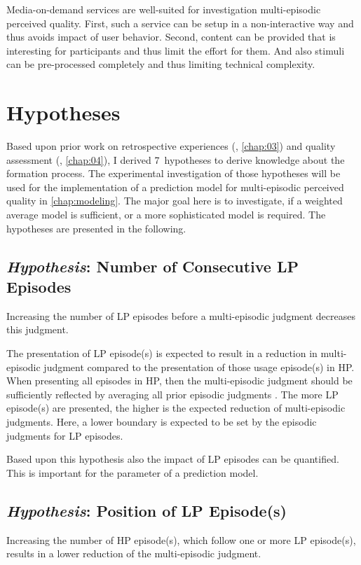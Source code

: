 Media-on-demand services are well-suited for investigation multi-episodic perceived quality.
First, such a service can be setup in a non-interactive way and thus avoids impact of user behavior.
Second, content can be provided that is interesting for participants and thus limit the effort for them.
And also stimuli can be pre-processed completely and thus limiting technical complexity.

\section{Hypotheses}
Based upon prior work on retrospective experiences (\cf, \autoref{chap:03}) and quality assessment (\cf, \autoref{chap:04}), I derived 7~hypotheses to derive knowledge about the formation process.
The experimental investigation of those hypotheses will be used for the implementation of a prediction model for multi-episodic perceived quality in \autoref{chap:modeling}.
The major goal here is to investigate, if a weighted average model is sufficient, or a more sophisticated model is required.
The hypotheses are presented in the following.

\subsection{\emph{Hypothesis}: Number of Consecutive \acs{LP} Episodes}
\begin{hypothesis}\label{hypo:number}
Increasing the number of \ac{LP} episodes before a multi-episodic judgment decreases this judgment.
\end{hypothesis}

The presentation of \ac{LP} episode(s) is expected to result in a reduction in multi-episodic judgment compared to the presentation of those usage episode(s) in \ac{HP}.
When presenting all episodes in \ac{HP}, then the multi-episodic judgment should be sufficiently reflected by averaging all prior episodic judgments \citep[\cf,][]{moller_single-call_2011}.
The more \ac{LP} episode(s) are presented, the higher is the expected reduction of multi-episodic judgments.
Here, a lower boundary is expected to be set by the episodic judgments for \ac{LP} episodes.

Based upon this hypothesis also the impact of \ac{LP} episodes can be quantified.
This is important for the parameter of a prediction model.


\subsection{\emph{Hypothesis}: Position of \acs{LP} Episode(s)}
\begin{hypothesis}\label{hypo:position}
Increasing the number of \ac{HP} episode(s), which follow one or more \ac{LP} episode(s), results in a lower reduction of the multi-episodic judgment.
\end{hypothesis}

